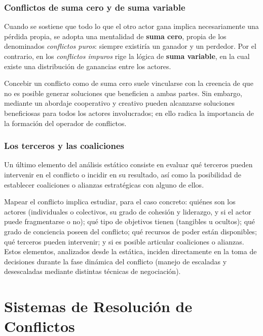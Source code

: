 \documentclass[12pt,oneside]{book}
\begin{document}
\subsection{Conflictos de suma cero y de suma variable}

Cuando se sostiene que todo lo que el otro actor gana implica necesariamente una pérdida propia, se adopta una mentalidad de \textbf{suma cero}, propia de los denominados \textit{conflictos puros}: siempre existiría un ganador y un perdedor. Por el contrario, en los \textit{conflictos impuros} rige la lógica de \textbf{suma variable}, en la cual existe una distribución de ganancias entre los actores.

Concebir un conflicto como de suma cero suele vincularse con la creencia de que no es posible generar soluciones que beneficien a ambas partes. Sin embargo, mediante un abordaje cooperativo y creativo pueden alcanzarse soluciones beneficiosas para todos los actores involucrados; en ello radica la importancia de la formación del operador de conflictos.

\subsection{Los terceros y las coaliciones}

Un último elemento del análisis estático consiste en evaluar qué terceros pueden intervenir en el conflicto o incidir en su resultado, así como la posibilidad de establecer coaliciones o alianzas estratégicas con alguno de ellos.

\begin{note}
Mapear el conflicto implica estudiar, para el caso concreto: quiénes son los actores (individuales o colectivos, su grado de cohesión y liderazgo, y si el actor puede fragmentarse o no); qué tipo de objetivos tienen (tangibles u ocultos); qué grado de conciencia poseen del conflicto; qué recursos de poder están disponibles; qué terceros pueden intervenir; y si es posible articular coaliciones o alianzas. Estos elementos, analizados desde la estática, inciden directamente en la toma de decisiones durante la fase dinámica del conflicto (manejo de escaladas y desescaladas mediante distintas técnicas de negociación).
\end{note}

\chapter{Sistemas de Resolución de Conflictos}
\end{document}

